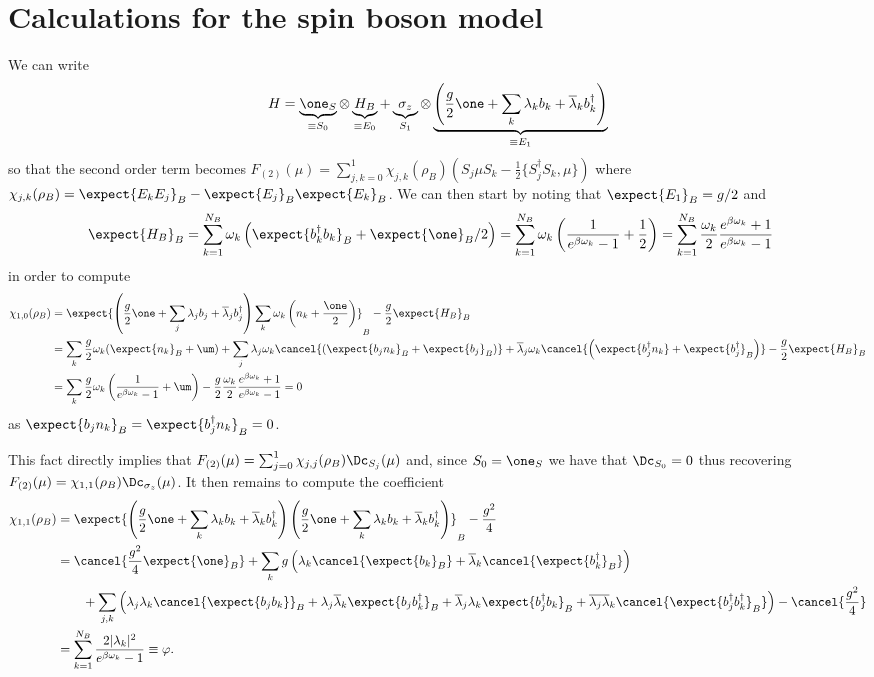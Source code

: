 \section{Calculations for the spin boson model}
\label{sec:spin_boson_model_calculations}
We can write  
\[H = \underbrace{\one_S}_{\equiv S_0} \otimes \underbrace{H_B}_{\equiv E_0} + \underbrace{\sigma_z}_{S_1} \otimes \underbrace{\left(\frac{g}{2}\one + \sum_k \lambda_k b_k + \overline{\lambda}_k b_k^\dag\right)}_{\equiv E_1}\]
so that the second order term becomes $F_{(2)}(\mu) = \sum_{j,k=0}^1 \chi_{j,k}(\rho_B) \left(S_j\mu S_k - \frac{1}{2}\{S_j^\dag S_k, \mu\}\right)$
where $\chi_{j,k}(\rho_B) = \expect{E_k E_j}_B - \expect{E_j}_B \expect{E_k}_B$. 
We can then start by noting that \(\expect{E_1}_B = g/2\) and 
\begin{align*}
    \expect{H_B}_B &= \sum_{k=1}^{N_B} \omega_k \left( \expect{b_k^\dag b_k}_B + \expect{\one}_B/2\right)= \sum_{k=1}^{N_B} \omega_k \left( \frac{1}{e^{\beta \omega_k}-1} + \frac{1}{2}\right) 
    = \sum_{k=1}^{N_B} \frac{\omega_k}{2} \frac{ e^{\beta \omega_k}+1}{e^{\beta \omega_k}-1}
\end{align*} 
in order to compute
\begin{align*}
    \chi_{1,0}(\rho_B) &= \expect{\left(\frac{g}{2}\one + \sum_j\lambda_j b_j + \overline{\lambda}_jb_j^\dag\right)\sum_k\omega_k\left(n_k+\frac{\one}{2}\right)}_B - \frac{g}{2} \expect{H_B}_B\\
    &= \sum_k \frac{g}{2}\omega_k (\expect{n_k}_B + \um) +\sum_{j}\lambda_j\omega_k \cancel{(\expect{b_jn_k}_B +\expect{b_j}_B)} + \overline{\lambda}_j\omega_k\cancel{\left(\expect{b_j^\dag n_k} + \expect{b_j^\dag}_B\right)} - \frac{g}{2} \expect{H_B}_B\\
    & = \sum_k \frac{g}{2}\omega_k \left(\frac{1}{e^{\beta \omega_k}-1} + \um\right) - \frac{g}{2} \frac{\omega_k}{2} \frac{ e^{\beta \omega_k}+1}{e^{\beta \omega_k}-1} = 0
\end{align*}
as $\expect{b_jn_k}_B = \expect{b_j^\dag n_k}_B =0$.

This fact directly implies that $F_{(2)}(\mu) = \sum_{j=0}^1 \chi_{j,j}(\rho_B)\Dc_{S_j}(\mu)$ and, since $S_0=\one_S$ we have that $\Dc_{S_0} = 0$ thus recovering $F_{(2)}(\mu) = \chi_{1,1}(\rho_B)\Dc_{\sigma_z}(\mu)$. It then remains to compute the coefficient
\begin{align*}
    \chi_{1,1}(\rho_B) &= \expect{\left(\frac{g}{2}\one + \sum_k \lambda_k b_k + \overline{\lambda}_k b_k^\dag\right)\left(\frac{g}{2}\one + \sum_k \lambda_k b_k + \overline{\lambda}_k b_k^\dag\right)}_B - \frac{g^2}{4}\\
    &= \cancel{\frac{g^2}{4}\expect{\one}_B} + \sum_k g\left(\lambda_k \cancel{\expect{b_k}_B} + \overline{\lambda}_k \cancel{\expect{b_k^\dag}_B}\right) \\&\qquad +\sum_{j,k} \left(\lambda_j\lambda_k \cancel{\expect{b_jb_k}}_B + \lambda_j\overline{\lambda}_k \expect{b_jb_k^\dag}_B + \overline{\lambda}_j\lambda_k \expect{b_j^\dag b_k}_B + \overline{\lambda_j}\overline{\lambda}_k \cancel{\expect{b_j^\dag b_k^\dag}_B}\right)  - \cancel{\frac{g^2}{4}}\\
    &= \sum_{k=1}^{N_B} \frac{2|\lambda_k|^2}{e^{\beta \omega_k}-1} \equiv \varphi.
\end{align*}
